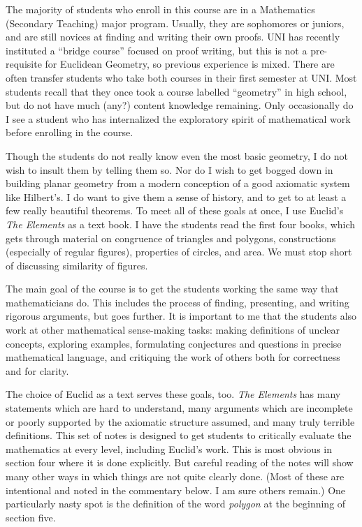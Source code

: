 \documentclass{tufte-handout}
\theoremstyle{definition}
\begin{document}
The majority of students who enroll in this course are in a Mathematics (Secondary Teaching) major program. Usually, they are sophomores or juniors, and are still novices at finding and writing their own proofs. UNI has recently instituted a ``bridge course'' focused on proof writing, but this is not a pre-requisite for Euclidean Geometry, so previous experience is mixed. There are often transfer students who take both courses in their first semester at UNI. Most students recall that they once took a course labelled ``geometry'' in high school, but do not have much (any?) content knowledge remaining. Only occasionally do I see a student who has internalized the exploratory spirit of mathematical work before enrolling in the course.

Though the students do not really know even the most basic geometry, I do not wish to insult them by telling them so. Nor do I wish to get bogged down in building planar geometry from a modern conception of a good axiomatic system like Hilbert's\cite{Hilbert}. I do want to give them a sense of history, and to get to at least a few really beautiful theorems. To meet all of these goals at once, I use Euclid's \emph{The Elements}\cite{Euclid} as a text book. I have the students read the first four books, which gets through material on congruence of triangles and polygons, constructions (especially of regular figures), properties of circles, and area. We must stop short of discussing similarity of figures.

The main goal of the course is to get the students working the same way that mathematicians do. This includes the process of finding, presenting, and writing rigorous arguments, but goes further. It is important to me that the students also work at other mathematical sense-making tasks: making definitions of unclear concepts, exploring examples, formulating conjectures and questions in precise mathematical language, and critiquing the work of others both for correctness and for clarity. 

The choice of Euclid as a text serves these goals, too. \emph{The Elements} has many statements which are hard to understand, many arguments which are incomplete or poorly supported by the axiomatic structure assumed, and many truly terrible definitions. This set of notes is designed to get students to critically evaluate the mathematics at every level, including Euclid's work. This is most obvious in section four where it is done explicitly. But careful reading of the notes will show many other ways in which things are not quite clearly done. (Most of these are intentional and noted in the commentary below. I am sure others remain.) One particularly nasty spot is the definition of the word \emph{polygon} at the beginning of section five. 
\end{document}
